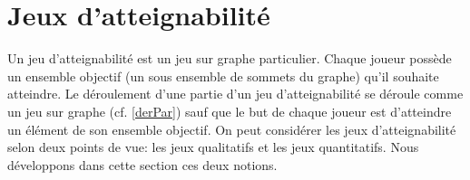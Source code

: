 
\section{Jeux d'atteignabilité}
\label{sect:jeuxAtt}

Un jeu d'atteignabilité est un jeu sur graphe particulier. Chaque joueur possède un ensemble objectif (un sous ensemble de sommets du graphe) qu'il souhaite atteindre. Le déroulement d'une partie d'un jeu d'atteignabilité se déroule comme un jeu sur graphe (cf. \ref{derPar}) sauf que le but de chaque joueur est d'atteindre un élément de son ensemble objectif. On peut considérer les jeux d'atteignabilité selon deux points de vue: les jeux qualitatifs et les jeux quantitatifs. Nous développons dans cette section ces deux notions.






